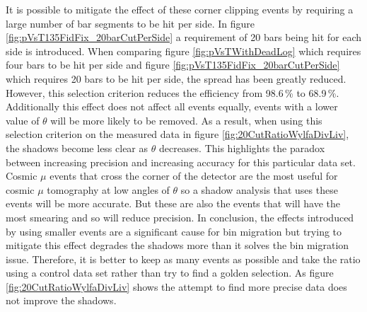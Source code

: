 

It is possible to mitigate the effect of these corner clipping events by requiring a large number of bar segments to be hit per side. In figure \ref{fig:pVsT135FidFix_20barCutPerSide} a requirement of 20 bars being hit for each side is introduced. When comparing figure \ref{fig:pVsTWithDeadLog} which requires four bars to be hit per side and figure \ref{fig:pVsT135FidFix_20barCutPerSide} which requires 20 bars to be hit per side, the spread has been greatly reduced. However, this selection criterion reduces the efficiency from 98.6\,\% to 68.9\,\%. Additionally this effect does not affect all events equally, events with a lower value of $\theta$ will be more likely to be removed. As a result, when using this selection criterion on the measured data in figure \ref{fig:20CutRatioWylfaDivLiv}, the shadows become less clear as $\theta$ decreases. This highlights the paradox between increasing precision and increasing accuracy for this particular data set. Cosmic $\mu$ events that cross the corner of the detector are the most useful for cosmic $\mu$ tomography at low angles of $\theta$ so a shadow analysis that uses these events will be more accurate. But these are also the events that will have the most smearing and so will reduce precision. In conclusion, the effects introduced by using smaller events are a significant cause for bin migration but trying to mitigate this effect degrades the shadows more than it solves the bin migration issue. Therefore, it is better to keep as many events as possible and take the ratio using a control data set rather than try to find a golden selection. As figure \ref{fig:20CutRatioWylfaDivLiv} shows the attempt to find more precise data does not improve the shadows.

